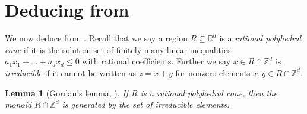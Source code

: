 \documentclass[11pt]{amsart}
\numberwithin{theorem}{section}
\numberwithin{equation}{section}
\newtheorem{lemma}[theorem]{Lemma}
\theoremstyle{definition}\newtheorem{defn}[theorem]{Definition}
\theoremstyle{definition}\newtheorem{remark}[theorem]{Remark}
\theoremstyle{definition}\newtheorem{question}[theorem]{Question}
\theoremstyle{definition}\newtheorem{problem}[theorem]{Problem}
\newcommand{\RR}{\mathbb{R}}
\newcommand{\ZZ}{\mathbb{Z}}
\begin{document}
\section{Deducing \texorpdfstring{ from }{Theorem 1.4 from Theorem 1.5}}
\label{sec:finishing-proof}

We now deduce  from .  Recall that we say a region $R \subseteq \RR^d$ is a \emph{rational polyhedral cone} if it is the solution set of finitely many linear inequalities $a_1 x_1 + \dots + a_d x_d \leq 0$ with rational coefficients. Further we say $x \in R \cap \ZZ^d$ is \emph{irreducible} if it cannot be written as $z = x+y$ for nonzero elements $x,y \in R \cap \ZZ^d$. 

\begin{lemma}[Gordan's lemma, {\cite[Proposition~1.2.17]{cls:toric}}]
\label{lem:gordon}
If $R$ is a rational polyhedral cone, then the monoid $R \cap \ZZ^d$ is generated by the set of \emph{irreducible} elements.
\end{lemma}
\end{document}
